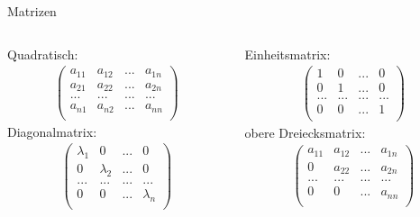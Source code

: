 \documentclass[german]{beamer}
\newcommand{\bq}{\begin{eqnarray*}}
\newcommand{\eq}{\end{eqnarray*}}
\begin{document}
\begin{frame}{Matrizen}

\begin{columns}[b]
\begin{column}{5cm}
\alert{Quadratisch}:
\bq
\left( \begin{array}{cccc}
 a_{11} & a_{12} & ... & a_{1n} \\
 a_{21} & a_{22} & ... & a_{2n} \\
 ...    & ...    & ... & ...    \\
 a_{n1} & a_{n2} & ... & a_{nn} \\
\end{array} \right)
\eq
%
\alert{Diagonalmatrix}:
\bq
\left( \begin{array}{cccc}
 \lambda_1 & 0 & ... & 0 \\
 0 & \lambda_2 & ... & 0 \\
 ...    & ...    & ... & ...    \\
 0 & 0 & ... & \lambda_n \\
\end{array} \right)
\eq
\end{column}
%
\begin{column}{5cm}
\alert{Einheitsmatrix}:
\bq
\left( \begin{array}{cccc}
 1 & 0 & ... & 0 \\
 0 & 1 & ... & 0 \\
 ...    & ...    & ... & ...    \\
 0 & 0 & ... & 1 \\
\end{array} \right)
\eq
%
\alert{obere Dreiecksmatrix}:
\bq
\left( \begin{array}{cccc}
 a_{11} & a_{12} & ... & a_{1n} \\
 0 & a_{22} & ... & a_{2n} \\
 ...    & ...    & ... & ...    \\
 0 & 0 & ... & a_{nn} \\
\end{array} \right)
\eq
\end{column}
\end{columns}

\end{frame}
\end{document}
